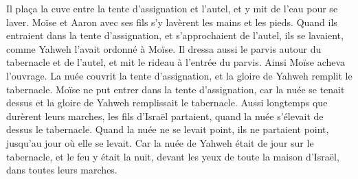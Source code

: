 \begin{multicols}{2}
Il plaça la cuve entre la tente d'assignation et l'autel, et y mit de l'eau pour se laver.
Moïse et Aaron avec ses fils s’y lavèrent les mains et les pieds.
Quand ils entraient dans la tente d'assignation, et s’approchaient de l'autel, ils se lavaient, comme Yahweh l'avait ordonné à Moïse.
Il dressa aussi le parvis autour du tabernacle et de l'autel, et mit le rideau à l’entrée du parvis. Ainsi Moïse acheva l'ouvrage.
La nuée couvrit la tente d'assignation, et la gloire de Yahweh remplit le tabernacle.
Moïse ne put entrer dans la tente d'assignation, car la nuée se tenait dessus et la gloire de Yahweh remplissait le tabernacle.
Aussi longtemps que durèrent leurs marches, les fils d’Israël partaient, quand la nuée s’élevait de dessus le tabernacle.
Quand la nuée ne se levait point, ils ne partaient point, jusqu’au jour où elle se levait.
Car la nuée de Yahweh était de jour sur le tabernacle, et le feu y était la nuit, devant les yeux de toute la maison d'Israël, dans toutes leurs marches.
\end{multicols}
